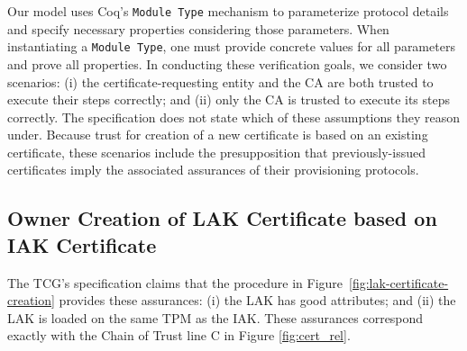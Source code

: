\documentclass[runningheads]{llncs}
\begin{document}
Our model uses Coq's \verb|Module Type| mechanism to parameterize
protocol details and specify necessary properties considering those
parameters.  When instantiating a \verb|Module Type|, one must provide
concrete values for all parameters and prove all properties.  In
conducting these verification goals, we consider two scenarios: (i)
the certificate-requesting entity and the CA are both trusted to
execute their steps correctly; and (ii) only the CA is trusted to
execute its steps correctly. The specification does not state which of
these assumptions they reason under.  Because trust for creation of a
new certificate is based on an existing certificate, these scenarios
include the presupposition that previously-issued certificates imply
the associated assurances of their provisioning protocols.

\subsection{Owner Creation of LAK Certificate based on IAK Certificate}

The TCG's specification claims that the procedure in
Figure~\ref{fig:lak-certificate-creation} provides
these assurances: (i) the LAK has good attributes; and (ii) the LAK is
loaded on the same TPM as the IAK. These assurances correspond exactly
with the Chain of Trust line C in Figure \ref{fig:cert_rel}.
\end{document}
